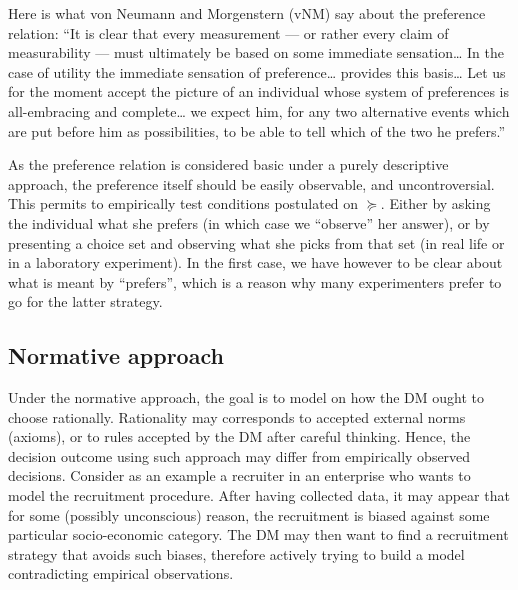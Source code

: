 \documentclass[french, english]{llncs}
\begin{document}
	Here is what von Neumann and Morgenstern (vNM) say about the preference relation:
	“It is clear that every measurement --- or rather every claim of measurability --- must ultimately be based on some immediate sensation\ldots
	In the case of utility the immediate sensation of preference\ldots%
	provides this basis\ldots %
	Let us for the moment accept the picture of an individual whose system of preferences is all-embracing and complete\ldots%
	 we expect him, for any two alternative events which are put before him as possibilities, to be able to tell which of the two he prefers.” %
	
	As the preference relation is considered basic under a purely descriptive approach, the preference itself should be easily observable, and uncontroversial. This permits to empirically test conditions postulated on $\succeq$. Either by asking the individual what she prefers (in which case we “observe” her answer), or by presenting a choice set and observing what she picks from that set (in real life or in a laboratory experiment). In the first case, we have however to be clear about what is meant by “prefers”, which is a reason why many experimenters prefer to go for the latter strategy.
	
	\subsection{Normative approach}
	Under the normative approach, the goal is to model on how the \ac{DM} ought to choose rationally. Rationality may corresponds to accepted external norms (axioms), or to rules accepted by the \ac{DM} after careful thinking. Hence, the decision outcome using such approach may differ from empirically observed decisions. Consider as an example a recruiter in an enterprise who wants to model the recruitment procedure. After having collected data, it may appear that for some (possibly unconscious) reason, the recruitment is biased against some particular socio-economic category. The \ac{DM} may then want to find a recruitment strategy that avoids such biases, therefore actively trying to build a model contradicting empirical observations. 
	
\end{document}
